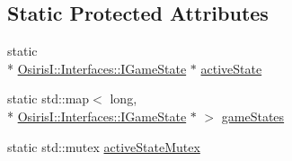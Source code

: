 \subsection*{Static Protected Attributes}
\begin{DoxyCompactItemize}
\item 
static \\*
\hyperlink{class_osiris_i_1_1_interfaces_1_1_i_game_state}{Osiris\-I\-::\-Interfaces\-::\-I\-Game\-State} $\ast$ \hyperlink{class_osiris_i_1_1_manager_1_1_game_state_manager_a9725a5c24a6572d9408f5abdcfb5f46a}{active\-State}
\item 
static std\-::map$<$ long, \\*
\hyperlink{class_osiris_i_1_1_interfaces_1_1_i_game_state}{Osiris\-I\-::\-Interfaces\-::\-I\-Game\-State} $\ast$ $>$ \hyperlink{class_osiris_i_1_1_manager_1_1_game_state_manager_aa7b5fed5ad3acd852830ef5a8f094c6e}{game\-States}
\item 
static std\-::mutex \hyperlink{class_osiris_i_1_1_manager_1_1_game_state_manager_ada0db500e8111d19023ef2b0103f4a0f}{active\-State\-Mutex}
\end{DoxyCompactItemize}


